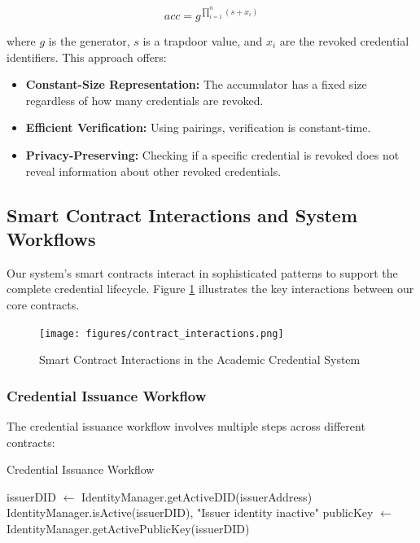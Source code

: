 \documentclass[lettersize,journal]{IEEEtran}
\begin{document}
\begin{itemize}
\begin{equation}
    acc = g^{\prod_{i=1}^{n} (s + x_i)}
\end{equation}

where $g$ is the generator, $s$ is a trapdoor value, and $x_i$ are the revoked credential identifiers. This approach offers:

\begin{itemize}
    \item \textbf{Constant-Size Representation:} The accumulator has a fixed size regardless of how many credentials are revoked.
    \item \textbf{Efficient Verification:} Using pairings, verification is constant-time.
    \item \textbf{Privacy-Preserving:} Checking if a specific credential is revoked does not reveal information about other revoked credentials.
\end{itemize}

\subsection{Smart Contract Interactions and System Workflows}

Our system's smart contracts interact in sophisticated patterns to support the complete credential lifecycle. Figure \ref{fig:contract_interactions} illustrates the key interactions between our core contracts.

\begin{figure}[h]
\centering
\texttt{[image: figures/contract\_interactions.png]}
\caption{Smart Contract Interactions in the Academic Credential System}
\label{fig:contract_interactions}
\end{figure}

\subsubsection{Credential Issuance Workflow}
The credential issuance workflow involves multiple steps across different contracts:

\begin{algorithm}[H]
\caption{Credential Issuance Workflow}
\begin{algorithmic}[1]
\State {}
\State issuerDID $\gets$ IdentityManager.getActiveDID(issuerAddress)
\State \Require IdentityManager.isActive(issuerDID), "Issuer identity inactive"
\State publicKey $\gets$ IdentityManager.getActivePublicKey(issuerDID)


\end{algorithmic}
\end{algorithm}
\end{itemize}
\end{document}
